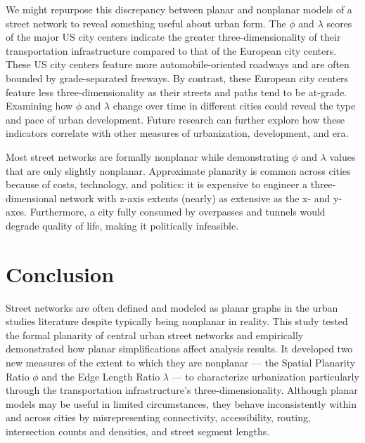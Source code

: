 \documentclass[Afour,sageh,times]{sagej}
\begin{document}
We might repurpose this discrepancy between planar and nonplanar models of a street network to reveal something useful about urban form. The $\phi$ and $\lambda$ scores of the major US city centers indicate the greater three-dimensionality of their transportation infrastructure compared to that of the European city centers. These US city centers feature more automobile-oriented roadways and are often bounded by grade-separated freeways. By contrast, these European city centers feature less three-dimensionality as their streets and paths tend to be at-grade. Examining how $\phi$ and $\lambda$ change over time in different cities could reveal the type and pace of urban development. Future research can further explore how these indicators correlate with other measures of urbanization, development, and era.

Most street networks are formally nonplanar while demonstrating $\phi$ and $\lambda$ values that are only slightly nonplanar. Approximate planarity is common across cities because of costs, technology, and politics: it is expensive to engineer a three-dimensional network with z-axis extents (nearly) as extensive as the x- and y-axes. Furthermore, a city fully consumed by overpasses and tunnels would degrade quality of life, making it politically infeasible.

\section{Conclusion}

Street networks are often defined and modeled as planar graphs in the urban studies literature despite typically being nonplanar in reality. This study tested the formal planarity of central urban street networks and  empirically demonstrated how planar simplifications affect analysis results. It developed two new measures of the extent to which they are nonplanar --- the Spatial Planarity Ratio $\phi$ and the Edge Length Ratio $\lambda$ ---  to characterize urbanization particularly through the transportation infrastructure's three-dimensionality. Although planar models may be useful in limited circumstances, they behave inconsistently within and across cities by misrepresenting connectivity, accessibility, routing, intersection counts and densities, and street segment lengths.




\end{document}
